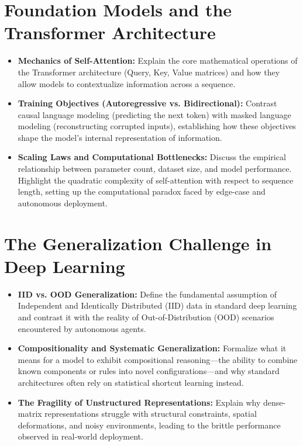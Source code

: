 \section{Foundation Models and the Transformer Architecture}
\begin{itemize}
    \item \textbf{Mechanics of Self-Attention:} Explain the core mathematical operations of the Transformer architecture (Query, Key, Value matrices) and how they allow models to contextualize information across a sequence.
    \item \textbf{Training Objectives (Autoregressive vs. Bidirectional):} Contrast causal language modeling (predicting the next token) with masked language modeling (reconstructing corrupted inputs), establishing how these objectives shape the model's internal representation of information.
    \item \textbf{Scaling Laws and Computational Bottlenecks:} Discuss the empirical relationship between parameter count, dataset size, and model performance. Highlight the quadratic complexity of self-attention with respect to sequence length, setting up the computational paradox faced by edge-case and autonomous deployment.
\end{itemize}

\section{The Generalization Challenge in Deep Learning}
\begin{itemize}
    \item \textbf{IID vs. OOD Generalization:} Define the fundamental assumption of Independent and Identically Distributed (IID) data in standard deep learning and contrast it with the reality of Out-of-Distribution (OOD) scenarios encountered by autonomous agents.
    \item \textbf{Compositionality and Systematic Generalization:} Formalize what it means for a model to exhibit compositional reasoning---the ability to combine known components or rules into novel configurations---and why standard architectures often rely on statistical shortcut learning instead.
    \item \textbf{The Fragility of Unstructured Representations:} Explain why dense-matrix representations struggle with structural constraints, spatial deformations, and noisy environments, leading to the brittle performance observed in real-world deployment.
\end{itemize}

